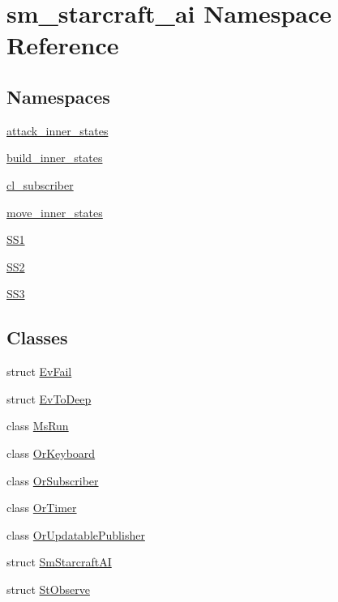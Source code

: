 \hypertarget{namespacesm__starcraft__ai}{}\section{sm\+\_\+starcraft\+\_\+ai Namespace Reference}
\label{namespacesm__starcraft__ai}
\subsection*{Namespaces}
\begin{DoxyCompactItemize}
\item 
 \hyperlink{namespacesm__starcraft__ai_1_1attack__inner__states}{attack\+\_\+inner\+\_\+states}
\item 
 \hyperlink{namespacesm__starcraft__ai_1_1build__inner__states}{build\+\_\+inner\+\_\+states}
\item 
 \hyperlink{namespacesm__starcraft__ai_1_1cl__subscriber}{cl\+\_\+subscriber}
\item 
 \hyperlink{namespacesm__starcraft__ai_1_1move__inner__states}{move\+\_\+inner\+\_\+states}
\item 
 \hyperlink{namespacesm__starcraft__ai_1_1SS1}{S\+S1}
\item 
 \hyperlink{namespacesm__starcraft__ai_1_1SS2}{S\+S2}
\item 
 \hyperlink{namespacesm__starcraft__ai_1_1SS3}{S\+S3}
\end{DoxyCompactItemize}
\subsection*{Classes}
\begin{DoxyCompactItemize}
\item 
struct \hyperlink{structsm__starcraft__ai_1_1EvFail}{Ev\+Fail}
\item 
struct \hyperlink{structsm__starcraft__ai_1_1EvToDeep}{Ev\+To\+Deep}
\item 
class \hyperlink{classsm__starcraft__ai_1_1MsRun}{Ms\+Run}
\item 
class \hyperlink{classsm__starcraft__ai_1_1OrKeyboard}{Or\+Keyboard}
\item 
class \hyperlink{classsm__starcraft__ai_1_1OrSubscriber}{Or\+Subscriber}
\item 
class \hyperlink{classsm__starcraft__ai_1_1OrTimer}{Or\+Timer}
\item 
class \hyperlink{classsm__starcraft__ai_1_1OrUpdatablePublisher}{Or\+Updatable\+Publisher}
\item 
struct \hyperlink{structsm__starcraft__ai_1_1SmStarcraftAI}{Sm\+Starcraft\+AI}
\item 
struct \hyperlink{structsm__starcraft__ai_1_1StObserve}{St\+Observe}
\end{DoxyCompactItemize}
